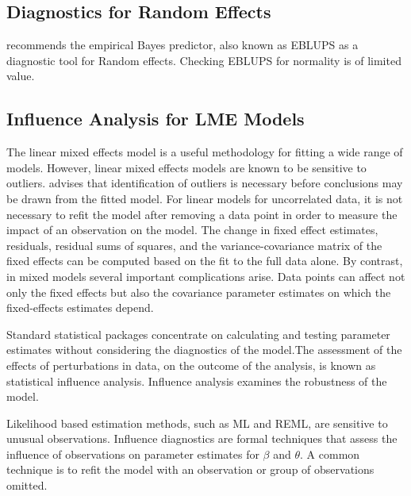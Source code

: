 \documentclass[12pt, a4paper]{report}
\theoremstyle{plain}
\theoremstyle{definition}
\theoremstyle{remark}
\begin{document}
\subsection{Diagnostics for Random Effects}
\citet{west} recommends the empirical Bayes predictor, also known as EBLUPS as a diagnostic tool for Random effects. Checking EBLUPS for normality is of limited value.

	\subsection{Influence Analysis for LME Models} %
	The linear mixed effects model is a useful methodology for fitting a wide range of models. However, linear mixed effects models are known to be sensitive to outliers. \citet{Christensen} advises that identification of outliers is necessary before conclusions may be drawn from the fitted model. For linear models for uncorrelated data, it is not necessary to refit the model after removing a data point in order to measure the impact of an observation on the model. The change in fixed effect estimates, residuals, residual sums of squares, and the variance-covariance matrix of the fixed effects can be computed based on the fit to the full data alone. By contrast, in mixed models several important complications arise. Data points can affect not only the fixed effects but also the covariance parameter estimates on which the fixed-effects estimates depend.
	
	
	Standard statistical packages concentrate on calculating and testing parameter estimates without considering the diagnostics of the model.The assessment of the effects of perturbations in data, on the outcome of the analysis, is known as statistical influence analysis. Influence analysis examines the robustness of the model.
	

	
	
	
	Likelihood based estimation methods, such as ML and REML, are sensitive to unusual observations. Influence diagnostics are formal techniques that assess the influence of observations on parameter estimates for $\beta$ and $\theta$. A common technique is to refit the model with an observation or group of observations omitted.
	
	
\end{document}
